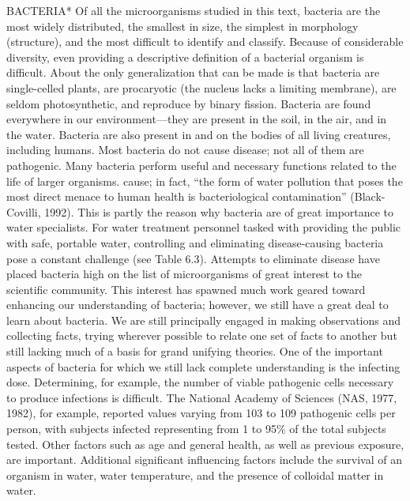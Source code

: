 \documentclass{article}
\begin{document}
BACTERIA* Of all the microorganisms studied in this text, bacteria are
the most widely distributed, the smallest in size, the simplest in
morphology (structure), and the most difficult to identify and classify.
Because of considerable diversity, even providing a descriptive
definition of a bacterial organism is difficult. About the only
generalization that can be made is that bacteria are single-celled
plants, are procaryotic (the nucleus lacks a limiting membrane), are
seldom photosynthetic, and reproduce by binary fission. Bacteria are
found everywhere in our environment---they are present in the soil, in
the air, and in the water. Bacteria are also present in and on the
bodies of all living creatures, including humans. Most bacteria do not
cause disease; not all of them are pathogenic. Many bacteria perform
useful and necessary functions related to the life of larger organisms.
cause; in fact, ``the form of water pollution that poses the most direct
menace to human health is bacteriological contamination''
(Black-Covilli, 1992). This is partly the reason why bacteria are of
great importance to water specialists. For water treatment personnel
tasked with providing the public with safe, portable water, controlling
and eliminating disease-causing bacteria pose a constant challenge (see
Table 6.3). Attempts to eliminate disease have placed bacteria high on
the list of microorganisms of great interest to the scientific
community. This interest has spawned much work geared toward enhancing
our understanding of bacteria; however, we still have a great deal to
learn about bacteria. We are still principally engaged in making
observations and collecting facts, trying wherever possible to relate
one set of facts to another but still lacking much of a basis for grand
unifying theories. One of the important aspects of bacteria for which we
still lack complete understanding is the infecting dose. Determining,
for example, the number of viable pathogenic cells necessary to produce
infections is difficult. The National Academy of Sciences (NAS, 1977,
1982), for example, reported values varying from 103 to 109 pathogenic
cells per person, with subjects infected representing from 1 to 95\% of
the total subjects tested. Other factors such as age and general health,
as well as previous exposure, are important. Additional significant
influencing factors include the survival of an organism in water, water
temperature, and the presence of colloidal matter in water.
\end{document}
